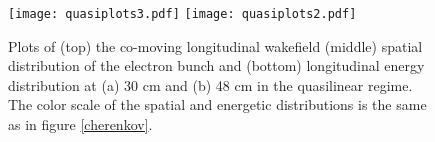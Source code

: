 \begin{figure}
\centering
\texttt{[image: quasiplots3.pdf]}\hspace{24pt}
\texttt{[image: quasiplots2.pdf]}
\caption{\small{Plots of (top) the co-moving longitudinal wakefield (middle) spatial distribution of the electron bunch and (bottom) longitudinal energy distribution at (a) 30 cm and (b) 48 cm in the quasilinear regime. The color scale of the spatial and energetic distributions is the same as in figure \ref{cherenkov}. }}
\label{quasiplots}
\end{figure}
